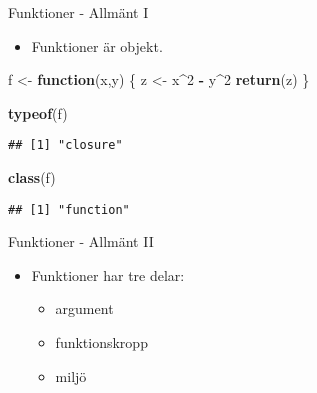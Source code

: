 \documentclass[
  11pt,
  ignorenonframetext,
]{beamer}
\newenvironment{Shaded}{\begin{snugshade}}{\end{snugshade}}
\newcommand{\ControlFlowTok}[1]{\textcolor[rgb]{0.13,0.29,0.53}{\textbf{#1}}}
\newcommand{\DecValTok}[1]{\textcolor[rgb]{0.00,0.00,0.81}{#1}}
\newcommand{\FunctionTok}[1]{\textcolor[rgb]{0.13,0.29,0.53}{\textbf{#1}}}
\newcommand{\NormalTok}[1]{#1}
\newcommand{\OtherTok}[1]{\textcolor[rgb]{0.56,0.35,0.01}{#1}}
\newcommand{\SpecialCharTok}[1]{\textcolor[rgb]{0.81,0.36,0.00}{\textbf{#1}}}
\providecommand{\tightlist}{%
  \setlength{\itemsep}{0pt}\setlength{\parskip}{0pt}}
\begin{document}
\begin{frame}[fragile]{Funktioner - Allmänt I}
\label{funktioner---allmuxe4nt-i}
\begin{itemize}
\tightlist
\item
  Funktioner är objekt.
\end{itemize}

\begin{Shaded}
\begin{Highlighting}[]
\NormalTok{f }\OtherTok{\textless{}{-}} \ControlFlowTok{function}\NormalTok{(x,y) \{}
\NormalTok{  z }\OtherTok{\textless{}{-}}\NormalTok{ x}\SpecialCharTok{\^{}}\DecValTok{2} \SpecialCharTok{{-}}\NormalTok{ y}\SpecialCharTok{\^{}}\DecValTok{2}
  \FunctionTok{return}\NormalTok{(z)}
\NormalTok{\}}
\end{Highlighting}
\end{Shaded}

\begin{Shaded}
\begin{Highlighting}[]
\FunctionTok{typeof}\NormalTok{(f)}
\end{Highlighting}
\end{Shaded}

\begin{verbatim}
## [1] "closure"
\end{verbatim}

\begin{Shaded}
\begin{Highlighting}[]
\FunctionTok{class}\NormalTok{(f)}
\end{Highlighting}
\end{Shaded}

\begin{verbatim}
## [1] "function"
\end{verbatim}
\end{frame}

\begin{frame}{Funktioner - Allmänt II}
\label{funktioner---allmuxe4nt-ii}
\begin{itemize}
\tightlist
\item
  Funktioner har tre delar:

  \begin{itemize}
  \tightlist
  \item
    argument
  \item
    funktionskropp
  \item
    miljö
  \end{itemize}
\end{itemize}
\end{frame}
\end{document}
